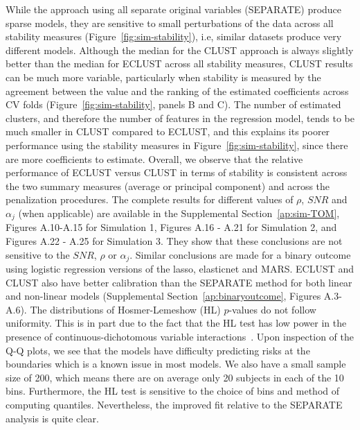 

While the approach using all separate original variables (SEPARATE) produce sparse models, they are sensitive to small perturbations of the data across all stability measures (Figure~\ref{fig:sim-stability}), i.e, similar datasets produce very different models. 
Although the median for the CLUST approach is always slightly better than the median for ECLUST across all stability measures, CLUST results can be much more variable, particularly when stability is measured by the agreement between the value and the ranking of the estimated coefficients across CV folds (Figure~\ref{fig:sim-stability}, panels B and C). The number of estimated clusters, and therefore the number of features in the regression model, tends to be much smaller in CLUST compared to ECLUST, and this explains its poorer performance using the stability measures in Figure~\ref{fig:sim-stability}, since there are more coefficients to estimate. Overall, we observe that the relative performance of ECLUST versus CLUST in terms of stability is consistent across the two summary measures (average or principal component) and across the penalization procedures. The complete results for different values of $\rho$, $SNR$ and $\alpha_{j}$ (when applicable) are available in the Supplemental Section~\ref{ap:sim-TOM}, Figures A.10-A.15 for Simulation 1, Figures A.16 - A.21 for Simulation 2, and Figures A.22 - A.25 for Simulation 3. They show that these conclusions are not sensitive to the $SNR$, $\rho$ or $\alpha_j$. Similar conclusions are made for a binary outcome using logistic regression versions of the lasso, elasticnet and MARS. ECLUST and CLUST also have better calibration than the SEPARATE method for both linear and non-linear models (Supplemental Section~\ref{ap:binaryoutcome}, Figures A.3-A.6). The distributions of Hosmer-Lemeshow (HL) $p$-values do not follow uniformity. This is in part due to the fact that the HL test has low power in the presence of continuous-dichotomous variable interactions~\citep{hosmer1997comparison}. Upon inspection of the Q-Q plots, we see that the models have difficulty predicting risks at the boundaries which is a known issue in most models. We also have a small sample size of 200, which means there are on average only 20 subjects in each of the 10 bins. Furthermore, the HL test is sensitive to the choice of bins and method of computing quantiles. Nevertheless, the improved fit relative to the SEPARATE analysis is quite clear.

